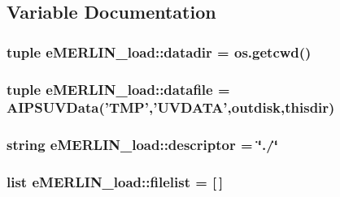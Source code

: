 \subsection{\-Variable \-Documentation}
\hypertarget{namespacee_m_e_r_l_i_n__load_a12e27e0f750273e7f703b10d29bcf3ed}{
\subsubsection[{datadir}]{\setlength{\rightskip}{0pt plus 5cm}tuple {\bf e\-M\-E\-R\-L\-I\-N\-\_\-load\-::datadir} = os.\-getcwd()}}\label{namespacee_m_e_r_l_i_n__load_a12e27e0f750273e7f703b10d29bcf3ed}
\hypertarget{namespacee_m_e_r_l_i_n__load_ab7734c045283180c19a27a1855fe9548}{
\subsubsection[{datafile}]{\setlength{\rightskip}{0pt plus 5cm}tuple {\bf e\-M\-E\-R\-L\-I\-N\-\_\-load\-::datafile} = \-A\-I\-P\-S\-U\-V\-Data('\-T\-M\-P','\-U\-V\-D\-A\-T\-A',{\bf outdisk},{\bf thisdir})}}\label{namespacee_m_e_r_l_i_n__load_ab7734c045283180c19a27a1855fe9548}
\hypertarget{namespacee_m_e_r_l_i_n__load_aebf7fb360efe7bf780864dff8e409e53}{
\subsubsection[{descriptor}]{\setlength{\rightskip}{0pt plus 5cm}string {\bf e\-M\-E\-R\-L\-I\-N\-\_\-load\-::descriptor} = \char`\"{}./\char`\"{}}}\label{namespacee_m_e_r_l_i_n__load_aebf7fb360efe7bf780864dff8e409e53}
\hypertarget{namespacee_m_e_r_l_i_n__load_a791ab43c58660bbfbffff06618ec5572}{
\subsubsection[{filelist}]{\setlength{\rightskip}{0pt plus 5cm}list {\bf e\-M\-E\-R\-L\-I\-N\-\_\-load\-::filelist} = \mbox{[}$\,$\mbox{]}}}\label{namespacee_m_e_r_l_i_n__load_a791ab43c58660bbfbffff06618ec5572}
